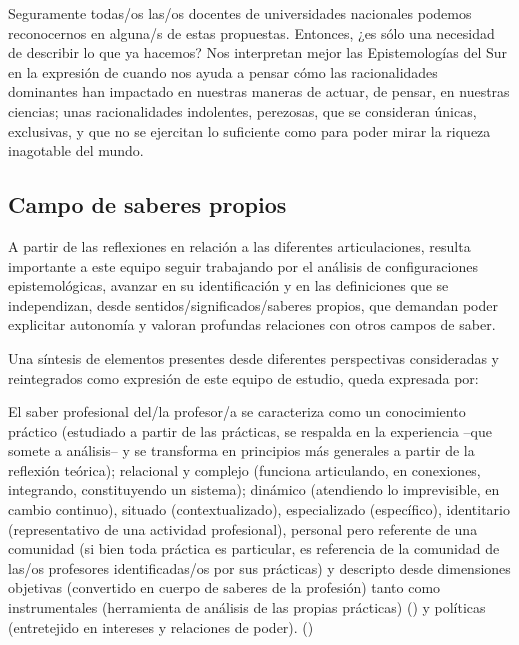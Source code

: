 \documentclass[oneside,spanish]{amsart}
\numberwithin{equation}{section}
\numberwithin{figure}{section}
\theoremstyle{definition}
\begin{document}
Seguramente todas/os las/os docentes de universidades nacionales podemos reconocernos en alguna/s de estas propuestas. Entonces, ¿es sólo una necesidad de describir lo que ya hacemos? Nos interpretan mejor las Epistemologías del Sur en la expresión de \cite{sousa06} cuando nos ayuda a pensar cómo las racionalidades dominantes han impactado en nuestras maneras de actuar, de pensar, en nuestras ciencias; unas racionalidades indolentes, perezosas, que se consideran únicas, exclusivas, y que no se ejercitan lo suficiente como para poder mirar la riqueza inagotable del mundo. 

\subsection{Campo de saberes propios}

A partir de las reflexiones en relación a las diferentes articulaciones, resulta importante a este equipo seguir trabajando por el análisis de configuraciones epistemológicas, avanzar en su identificación y en las definiciones que se independizan, desde sentidos/significados/saberes propios, que demandan poder explicitar autonomía y valoran profundas relaciones con otros campos de saber. 

Una síntesis de elementos presentes desde diferentes perspectivas consideradas y reintegrados como expresión de este equipo de estudio, queda expresada por:

El saber profesional del/la profesor/a se caracteriza como un conocimiento práctico (estudiado a partir de las prácticas, se respalda en la experiencia --que somete a análisis-- y se transforma en principios más generales a partir de la reflexión teórica); relacional y complejo (funciona articulando, en conexiones, integrando, constituyendo un sistema); dinámico (atendiendo lo imprevisible, en cambio continuo), situado (contextualizado), especializado (específico), identitario (representativo de una actividad profesional), personal pero referente de una comunidad (si bien toda práctica es particular, es referencia de la comunidad de las/os profesores identificadas/os por sus prácticas) y descripto desde dimensiones objetivas (convertido en cuerpo de saberes de la profesión) tanto como instrumentales (herramienta de análisis de las propias prácticas) (\cite{difranco18}) y políticas (entretejido en intereses y relaciones de poder). (\cite{difrancosiderac20})
\end{document}
